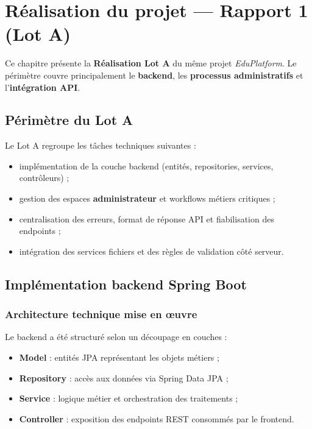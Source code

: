 \chapter{Réalisation du projet — Rapport 1 (Lot A)}

Ce chapitre présente la \textbf{Réalisation Lot A} du même projet \textit{EduPlatform}. Le périmètre couvre principalement le \textbf{backend}, les \textbf{processus administratifs} et l'\textbf{intégration API}.

\section{Périmètre du Lot A}

Le Lot A regroupe les tâches techniques suivantes :
\begin{itemize}[noitemsep]
    \item implémentation de la couche backend (entités, repositories, services, contrôleurs) ;
    \item gestion des espaces \textbf{administrateur} et workflows métiers critiques ;
    \item centralisation des erreurs, format de réponse API et fiabilisation des endpoints ;
    \item intégration des services fichiers et des règles de validation côté serveur.
\end{itemize}

\section{Implémentation backend Spring Boot}

\subsection{Architecture technique mise en œuvre}

Le backend a été structuré selon un découpage en couches :
\begin{itemize}[noitemsep]
    \item \textbf{Model} : entités JPA représentant les objets métiers ;
    \item \textbf{Repository} : accès aux données via Spring Data JPA ;
    \item \textbf{Service} : logique métier et orchestration des traitements ;
    \item \textbf{Controller} : exposition des endpoints REST consommés par le frontend.
\end{itemize}


